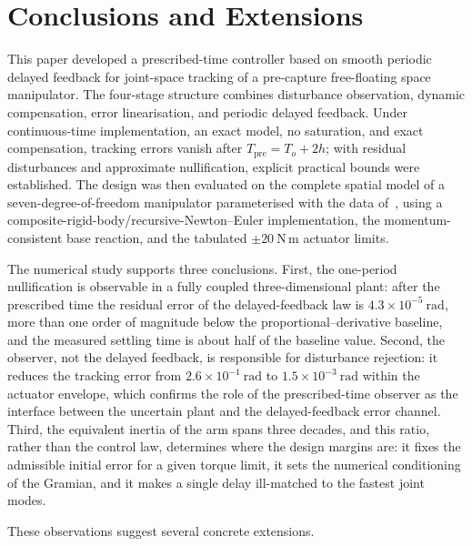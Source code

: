 \section{Conclusions and Extensions}\label{sec:conclusion}
This paper developed a prescribed-time controller based on smooth periodic delayed feedback for joint-space tracking of a pre-capture free-floating space manipulator. The four-stage structure combines disturbance observation, dynamic compensation, error linearisation, and periodic delayed feedback. Under continuous-time implementation, an exact model, no saturation, and exact compensation, tracking errors vanish after $T_{\mathrm{pre}}=T_o+2h$; with residual disturbances and approximate nullification, explicit practical bounds were established. The design was then evaluated on the complete spatial model of a seven-degree-of-freedom manipulator parameterised with the data of~\cite{dou2025fractional}, using a composite-rigid-body/recursive-Newton--Euler implementation, the momentum-consistent base reaction, and the tabulated $\pm20~\mathrm{N\,m}$ actuator limits.

The numerical study supports three conclusions. First, the one-period nullification is observable in a fully coupled three-dimensional plant: after the prescribed time the residual error of the delayed-feedback law is $4.3\times10^{-5}~\mathrm{rad}$, more than one order of magnitude below the proportional--derivative baseline, and the measured settling time is about half of the baseline value. Second, the observer, not the delayed feedback, is responsible for disturbance rejection: it reduces the tracking error from $2.6\times10^{-1}~\mathrm{rad}$ to $1.5\times10^{-3}~\mathrm{rad}$ within the actuator envelope, which confirms the role of the prescribed-time observer as the interface between the uncertain plant and the delayed-feedback error channel. Third, the equivalent inertia of the arm spans three decades, and this ratio, rather than the control law, determines where the design margins are: it fixes the admissible initial error for a given torque limit, it sets the numerical conditioning of the Gramian, and it makes a single delay ill-matched to the fastest joint modes.

These observations suggest several concrete extensions.

